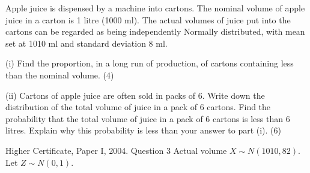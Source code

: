 \documentclass[a4paper,12pt]{article}
\begin{document}
\begin{framed}
\noindent Apple juice is dispensed by a machine into cartons.  The nominal volume of apple juice in a carton is 1 litre (1000 ml).  The actual volumes of juice put into the cartons can be regarded as being independently Normally distributed, with mean set at 1010 ml and standard deviation 8 ml. 
 
 
(i) Find the proportion, in a long run of production, of cartons containing less than the nominal volume. (4) 
 
 
(ii) Cartons of apple juice are often sold in packs of 6.  Write down the distribution of the total volume of juice in a pack of 6 cartons.  Find the probability that the total volume of juice in a pack of 6 cartons is less than 6 litres.  Explain why this probability is less than your answer to part (i). (6) 
 

 
 
\end{framed}
Higher Certificate, Paper I, 2004. Question 3
Actual volume $X \sim N(1010, 82)$. Let $Z \sim N(0,1)$.
\end{document}
